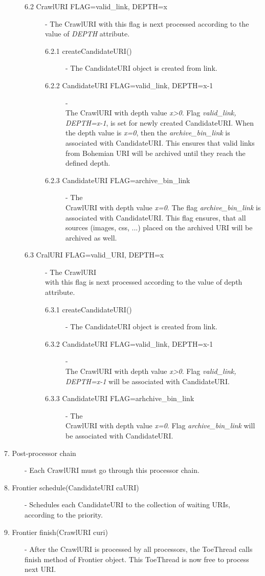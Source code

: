 \documentclass[11pt,a4paper]{article}
\begin{document}
\begin{description}
\begin{description}
\item[6.2 CrawlURI FLAG=valid\_link, DEPTH=x] - The CrawlURI with this flag is next processed according to the value of \emph{DEPTH} attribute.

\begin{description}
\item[6.2.1 createCandidateURI()] - The CandidateURI object is created from link.
\item[6.2.2 CandidateURI FLAG=valid\_link, DEPTH=x-1] - \\The CrawlURI with depth value \emph{x>0}. Flag \emph{valid\_link, \\DEPTH=x-1}, is set for newly created CandidateURI. When the depth value is \emph{x=0}, then the \emph{archive\_bin\_link} is associated with CandidateURI. This ensures that valid links from Bohemian URI will be archived until they reach the defined depth.
\item[6.2.3 CandidateURI FLAG=archive\_bin\_link] - The \\CrawlURI with depth value \emph{x=0}. The flag \emph{archive\_bin\_link} is associated with CandidateURI. This flag ensures, that all sources (images, css, ...) placed on the archived URI will be archived as well.
\end{description}


\item[6.3 CralURI FLAG=valid\_URI, DEPTH=x] - The CrawlURI \\with this flag is next processed according to the value of depth attribute.

\begin{description}
\item[6.3.1 createCandidateURI()] - The CandidateURI object is created from link.
\item[6.3.2 CandidateURI FLAG=valid\_link, DEPTH=x-1] - \\The CrawlURI with depth value \emph{x>0}. Flag \emph{valid\_link, \\DEPTH=x-1} will be associated with CandidateURI.
\item[6.3.3 CandidateURI FLAG=arhchive\_bin\_link] - The \\CrawlURI with depth value \emph{x=0}. Flag \emph{archive\_bin\_link} will be associated with CandidateURI.
\end{description}
\end{description}

\item[7. Post-processor chain] - Each CrawlURI must go through this processor chain.
\item[8. Frontier schedule(CandidateURI caURI)] - Schedules each CandidateURI to the collection of waiting URIs, according to the priority.
\item[9. Frontier finish(CrawlURI curi)] - After the CrawlURI is processed by all processors, the ToeThread calls finish method of Frontier object. This ToeThread is now free to process next URI.

\end{description}
\end{document}
